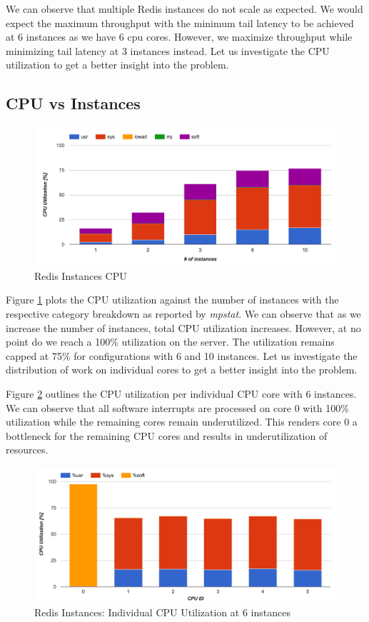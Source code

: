 We can observe that multiple Redis instances do not scale as expected. We would expect the maximum throughput with the minimum tail latency to be achieved at 6 instances as we have 6 cpu cores. However, we maximize throughput while minimizing tail latency at 3 instances instead. Let us investigate the CPU utilization to get a better insight into the problem.

\subsection{CPU vs Instances}
\begin{figure}[h]
    \includegraphics[width=\textwidth]{./res2/r_instances_cpu.png}
    \caption{Redis Instances CPU}
    \label{fig:r_instances_cpu}
\end{figure}

Figure \ref{fig:r_instances_cpu} plots the CPU utilization against the number of instances with the respective category breakdown as reported by \textit{mpstat}. We can observe that as we increase the number of instances, total CPU utilization increases. However, at no point do we reach a 100\% utilization on the server. The utilization remains capped at 75\% for configurations with 6 and 10 instances. Let us investigate the distribution of work on individual cores to get a better insight into the problem.

Figure \ref{fig:r_instances_cpu_individual} outlines the CPU utilization per individual CPU core with 6 instances. We can observe that all software interrupts are processed on core 0 with 100\% utilization while the remaining cores remain underutilized. This renders core 0 a bottleneck for the remaining CPU cores and results in underutilization of resources.

\begin{figure}[h]
    \includegraphics[width=\textwidth]{./res2/r_instances_cpu_individual.png}
    \caption{Redis Instances: Individual CPU Utilization at 6 instances}
    \label{fig:r_instances_cpu_individual}
\end{figure}

